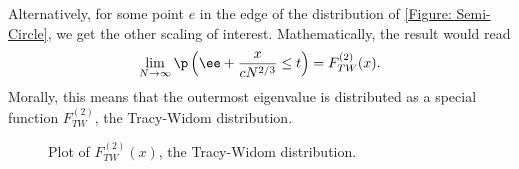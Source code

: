 Alternatively, for some point $e$ in the edge of the distribution of \autoref{Figure: Semi-Circle}, we get the other scaling of interest. Mathematically, the result would read
\begin{equation}
		\lim_{N\rightarrow \infty} \p\left(\ee + \frac{x}{c N^{2/3}} \leq t \right) = F_{TW}^{(2)}(x).
\end{equation}
Morally, this means that the outermost eigenvalue is distributed as a special function $F_{TW}^{(2)}$, the Tracy-Widom distribution. 

\begin{figure}[h!]
	\centering
	\caption{Plot of $F_{TW}^{(2)}(x)$, the Tracy-Widom distribution.}
	\label{Figure: Tracy-Widom}
\end{figure} 

